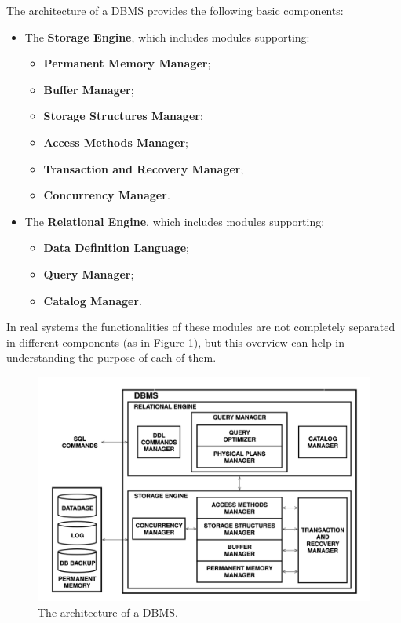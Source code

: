 The architecture of a DBMS provides the following basic components:
\begin{itemize}
    \item The \textbf{Storage Engine}, which includes modules supporting:
    \begin{itemize}
        \item \textbf{Permanent Memory Manager};
        \item \textbf{Buffer Manager};
        \item \textbf{Storage Structures Manager};
        \item \textbf{Access Methods Manager};
        \item \textbf{Transaction and Recovery Manager};
        \item \textbf{Concurrency Manager}.
    \end{itemize}

    \item The \textbf{Relational Engine}, which includes modules supporting:
    \begin{itemize}
        \item \textbf{Data Definition Language};
        \item \textbf{Query Manager};
        \item \textbf{Catalog Manager}.
    \end{itemize}
\end{itemize}
In real systems the functionalities of these modules are not completely separated in different components (as in Figure \ref{fig:DBMS_schema}), but this overview can help in understanding the purpose of each of them. 

\begin{figure}[ht]
    \centering
    \includegraphics[width=0.75\linewidth]{img/DBMS schema.png}
    \caption{The architecture of a DBMS.}
    \label{fig:DBMS_schema}
\end{figure}

